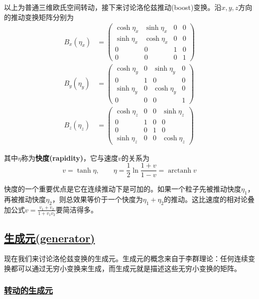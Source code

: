 以上为普通三维欧氏空间转动，接下来讨论洛伦兹推动(boost)变换。沿$x,y,z$方向的推动变换矩阵分别为
\begin{align*}
    B_x(\eta_x)&=
    \begin{pmatrix}
        \cosh\eta_x&\sinh\eta_x&0&0\\
        \sinh\eta_x&\cosh\eta_x&0&0\\
        0&0&1&0\\
        0&0&0&1
    \end{pmatrix}\\
    B_y(\eta_y)&=
    \begin{pmatrix}
        \cosh\eta_y&0&\sinh\eta_y&0\\
        0&1&0&0\\
        \sinh\eta_y&0&\cosh\eta_y&0\\
        0&0&0&1
    \end{pmatrix}\\
    B_z(\eta_z)&=
    \begin{pmatrix}
        \cosh\eta_z&0&0&\sinh\eta_z\\
        0&1&0&0\\
        0&0&1&0\\
        \sinh\eta_z&0&0&\cosh\eta_z
    \end{pmatrix}
\end{align*}

其中$\eta$称为\textbf{快度(rapidity)}，它与速度$v$的关系为
\begin{equation*}
    v = \tanh\eta, \qquad \eta = \frac{1}{2}\ln\frac{1+v}{1-v} = \operatorname{arctanh}v
\end{equation*}

快度的一个重要优点是它在连续推动下是可加的。如果一个粒子先被推动快度$\eta_1$，再被推动快度$\eta_2$，则总效果等价于一个快度为$\eta_1 + \eta_2$的推动。这比速度的相对论叠加公式$v = \frac{v_1+v_2}{1+v_1v_2}$要简洁得多。

\subsection{\protect\hyperlink{:}{生成元(generator)}}

现在我们来讨论洛伦兹变换的生成元。生成元的概念来自于李群理论：任何连续变换都可以通过无穷小变换来生成，而生成元就是描述这些无穷小变换的矩阵。

\subsubsection{\protect\hyperlink{:}{转动的生成元}}

